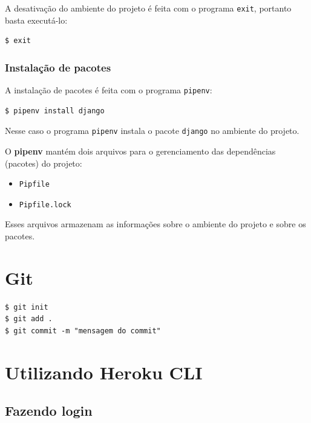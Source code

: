 \documentclass[brazil,a4paper,oneside,openright,parskip=full]{book}
\newcommand{\passthrough}[1]{#1}
\providecommand{\tightlist}{%
  \setlength{\itemsep}{0pt}\setlength{\parskip}{0pt}}
\begin{document}
A desativação do ambiente do projeto é feita com o programa
\passthrough{\lstinline!exit!}, portanto basta executá-lo:

\begin{lstlisting}[language=sh, style=nonumber]
$ exit
\end{lstlisting}

\hypertarget{instalauxe7uxe3o-de-pacotes-1}{%
\subsection{Instalação de pacotes}\label{instalauxe7uxe3o-de-pacotes-1}}

A instalação de pacotes é feita com o programa
\passthrough{\lstinline!pipenv!}:

\begin{lstlisting}[language=sh, style=nonumber]
$ pipenv install django
\end{lstlisting}

Nesse caso o programa \passthrough{\lstinline!pipenv!} instala o pacote
\passthrough{\lstinline!django!} no ambiente do projeto.

O \textbf{pipenv} mantém dois arquivos para o gerenciamento das
dependências (pacotes) do projeto:

\begin{itemize}
\tightlist
\item
  \passthrough{\lstinline!Pipfile!}
\item
  \passthrough{\lstinline!Pipfile.lock!}
\end{itemize}

Esses arquivos armazenam as informações sobre o ambiente do projeto e
sobre os pacotes.

\hypertarget{git}{%
\chapter{Git}\label{git}}

\begin{lstlisting}
$ git init
$ git add .
$ git commit -m "mensagem do commit"
\end{lstlisting}

\hypertarget{sec:heroku-cli}{%
\chapter{Utilizando Heroku CLI}\label{sec:heroku-cli}}

\hypertarget{fazendo-login}{%
\section{Fazendo login}\label{fazendo-login}}
\end{document}
